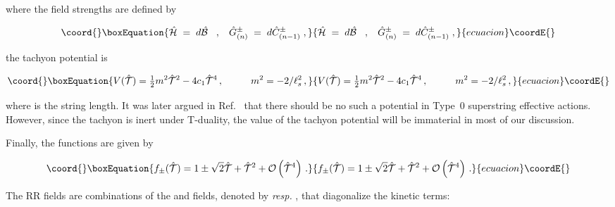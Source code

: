 \documentclass[12pt,a4paper]{article}
\begin{document}
\noindent where the field strengths are defined by

\begin{equation}\coord{}\boxEquation{
  \label{eq:10dfieldstrengths}
  \hat{\mathcal{H}}\;=\; d\hat{\mathcal{B}}\hspace{.3cm},\hspace{.3cm}
  \hat{G}_{(n)}^{\pm}\;=\; d\hat{C}_{(n-1)}^{\pm} \; ,
}{
  \hat{\mathcal{H}}\;=\; d\hat{\mathcal{B}}\hspace{.3cm},\hspace{.3cm}
  \hat{G}_{(n)}^{\pm}\;=\; d\hat{C}_{(n-1)}^{\pm} \; ,
}{ecuacion}\coordE{}\end{equation}

\noindent the tachyon potential is

\begin{equation}\coord{}\boxEquation{
V(\hat{\cal T})
={\textstyle\frac{1}{2}}m^{2}\hat{\cal T}^{2}-4c_{1}\hat{\cal T}^{4}\, ,
\hspace{1cm}
m^{2} =-2/\ell_{s}^{2}\, ,
}{
V(\hat{\cal T})
={\textstyle\frac{1}{2}}m^{2}\hat{\cal T}^{2}-4c_{1}\hat{\cal T}^{4}\, ,
\hspace{1cm}
m^{2} =-2/\ell_{s}^{2}\, ,
}{ecuacion}\coordE{}\end{equation}

\noindent where \coordHE{} 
is the string length.  It was later argued in Ref.~\cite{kn:Ts2} that
there should be no such a potential in Type~0 superstring effective
actions. However, since the tachyon is inert under T-duality, the
value of the tachyon potential \coordHE{} will be immaterial in most of our
discussion.

Finally, the functions \coordHE{} are given by

\begin{equation}\coord{}\boxEquation{
f_{\pm}(\hat{\cal T})=1\pm\sqrt{2}\hat{\cal T}+\hat{\cal T}^{2}+
\mathcal{O}\left(\hat{\mathcal{T}}^{4}\right) \, .
}{
f_{\pm}(\hat{\cal T})=1\pm\sqrt{2}\hat{\cal T}+\hat{\cal T}^{2}+
\mathcal{O}\left(\hat{\mathcal{T}}^{4}\right) \, .
}{ecuacion}\coordE{}\end{equation}

The RR fields are combinations of the \coordHE{} and \coordHE{}
fields, denoted by \coordHE{} {\em resp.} \coordHE{},
that diagonalize the kinetic terms:
\end{document}
